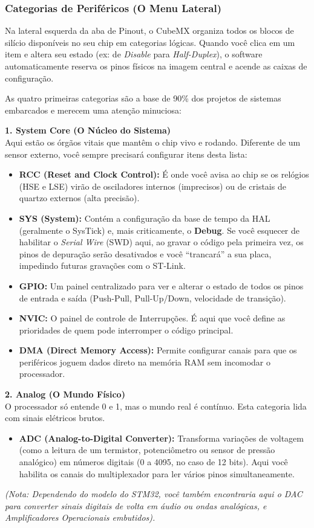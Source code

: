 \documentclass[12pt,a4paper]{article}
\begin{document}
\subsubsection{Categorias de Periféricos (O Menu Lateral)}
Na lateral esquerda da aba de Pinout, o CubeMX organiza todos os blocos de silício disponíveis no seu chip em categorias lógicas. Quando você clica em um item e altera seu estado (ex: de \textit{Disable} para \textit{Half-Duplex}), o software automaticamente reserva os pinos físicos na imagem central e acende as caixas de configuração.

As quatro primeiras categorias são a base de 90\% dos projetos de sistemas embarcados e merecem uma atenção minuciosa:

\textbf{1. System Core (O Núcleo do Sistema)}\\
Aqui estão os órgãos vitais que mantêm o chip vivo e rodando. Diferente de um sensor externo, você sempre precisará configurar itens desta lista:
\begin{itemize}
    \item \textbf{RCC (Reset and Clock Control):} É onde você avisa ao chip se os relógios (HSE e LSE) virão de osciladores internos (imprecisos) ou de cristais de quartzo externos (alta precisão).
    \item \textbf{SYS (System):} Contém a configuração da base de tempo da HAL (geralmente o SysTick) e, mais criticamente, o \textbf{Debug}. Se você esquecer de habilitar o \textit{Serial Wire} (SWD) aqui, ao gravar o código pela primeira vez, os pinos de depuração serão desativados e você ``trancará'' a sua placa, impedindo futuras gravações com o ST-Link.
    \item \textbf{GPIO:} Um painel centralizado para ver e alterar o estado de todos os pinos de entrada e saída (Push-Pull, Pull-Up/Down, velocidade de transição).
    \item \textbf{NVIC:} O painel de controle de Interrupções. É aqui que você define as prioridades de quem pode interromper o código principal.
    \item \textbf{DMA (Direct Memory Access):} Permite configurar canais para que os periféricos joguem dados direto na memória RAM sem incomodar o processador.
\end{itemize}

\textbf{2. Analog (O Mundo Físico)}\\
O processador só entende 0 e 1, mas o mundo real é contínuo. Esta categoria lida com sinais elétricos brutos.
\begin{itemize}
    \item \textbf{ADC (Analog-to-Digital Converter):} Transforma variações de voltagem (como a leitura de um termistor, potenciômetro ou sensor de pressão analógico) em números digitais (0 a 4095, no caso de 12 bits). Aqui você habilita os canais do multiplexador para ler vários pinos simultaneamente.
\end{itemize}
\textit{(Nota: Dependendo do modelo do STM32, você também encontraria aqui o DAC para converter sinais digitais de volta em áudio ou ondas analógicas, e Amplificadores Operacionais embutidos).}
\end{document}
